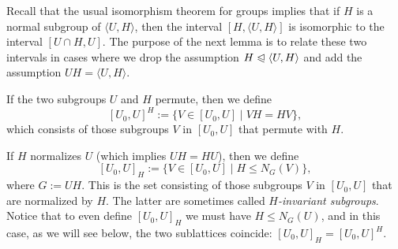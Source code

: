 \documentclass[cm,dissertation,actual,final]{uhthesis}
\theoremstyle{plain}
\theoremstyle{definition}
\theoremstyle{remark}
\numberwithin{theorem}{section}
\numberwithin{claim}{chapter}
\numberwithin{equation}{section}
\numberwithin{conjecture}{chapter}
\newcommand{\<}{\ensuremath{\langle}}
\renewcommand{\>}{\ensuremath{\rangle}}
\renewcommand{\leq}{\ensuremath{\leqslant}}
\newcommand{\subnormal}{\ensuremath{\trianglelefteqslant}}
\newcommand{\0}{\ensuremath{\mathbf{0}}}
\newcommand{\1}{\ensuremath{\mathbf{1}}}
\newcommand{\2}{\ensuremath{\mathbf{2}}}
\newcommand{\3}{\ensuremath{\mathbf{3}}}
\newcommand{\4}{\ensuremath{\mathbf{4}}}
\newcommand{\5}{\ensuremath{\mathbf{5}}}
\begin{document}
\begin{center}
\end{center}
Recall that the usual isomorphism theorem for groups implies
that 
if $H$ is a normal subgroup of $\<U, H\>$, 
then the interval
$[H, \<U, H\>]$ is isomorphic to the interval $[U\cap H, U]$.  The 
purpose of the next lemma is to relate these two
intervals in cases where we drop the assumption $H\subnormal \<U,H\>$
and add the assumption $UH = \<U,H\>$.

If the two subgroups $U$ and $H$ permute, then we define 
\begin{equation}
  \label{eq:dedekind-1}
[U_0, U]^H := \{ V\in [U_0,U] \mid VH = HV\},
\end{equation}
which consists of those subgroups $V$ in $[U_0, U]$ that permute with
$H$. 

If $H$ normalizes $U$ (which implies $UH=HU$), 
then we %
define
\begin{equation}
  \label{eq:dedekind-2}
[U_0, U]_H := \{ V\in [U_0,U] \mid H\leq N_G(V)\},
\end{equation}
where $G:=UH$.  This is the set consisting of those subgroups $V$ in $[U_0, U]$ that
are normalized by $H$.  The latter are sometimes called 
\emph{$H$-invariant subgroups}.
Notice that to even
define $[U_0, U]_H$ we must have $H\leq N_G(U)$, and in this case, as we will
see below, the two sublattices coincide: 
$[U_0, U]_H  =  [U_0, U]^H$.  
\end{document}
